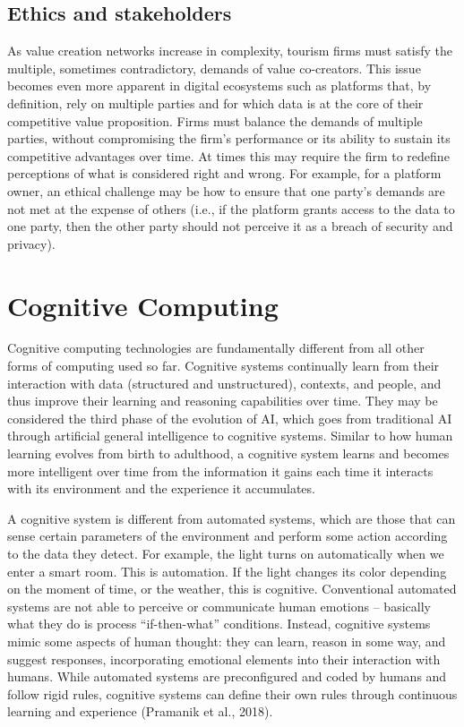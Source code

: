 \documentclass[
  letterpaper,
  DIV=11,
  numbers=noendperiod]{scrreprt}
\begin{document}
\hypertarget{ethics-and-stakeholders}{%
\subsection{Ethics and stakeholders}\label{ethics-and-stakeholders}}

As value creation networks increase in complexity, tourism firms must
satisfy the multiple, sometimes contradictory, demands of value
co-creators. This issue becomes even more apparent in digital ecosystems
such as platforms that, by definition, rely on multiple parties and for
which data is at the core of their competitive value proposition. Firms
must balance the demands of multiple parties, without compromising the
firm's performance or its ability to sustain its competitive advantages
over time. At times this may require the firm to redefine perceptions of
what is considered right and wrong. For example, for a platform owner,
an ethical challenge may be how to ensure that one party's demands are
not met at the expense of others (i.e., if the platform grants access to
the data to one party, then the other party should not perceive it as a
breach of security and privacy).

\hypertarget{cognitive-computing}{%
\section{Cognitive Computing}\label{cognitive-computing}}

Cognitive computing technologies are fundamentally different from all
other forms of computing used so far. Cognitive systems continually
learn from their interaction with data (structured and unstructured),
contexts, and people, and thus improve their learning and reasoning
capabilities over time. They may be considered the third phase of the
evolution of AI, which goes from traditional AI through artificial
general intelligence to cognitive systems. Similar to how human learning
evolves from birth to adulthood, a cognitive system learns and becomes
more intelligent over time from the information it gains each time it
interacts with its environment and the experience it accumulates.

A cognitive system is different from automated systems, which are those
that can sense certain parameters of the environment and perform some
action according to the data they detect. For example, the light turns
on automatically when we enter a smart room. This is automation. If the
light changes its color depending on the moment of time, or the weather,
this is cognitive. Conventional automated systems are not able to
perceive or communicate human emotions -- basically what they do is
process ``if-then-what'' conditions. Instead, cognitive systems mimic
some aspects of human thought: they can learn, reason in some way, and
suggest responses, incorporating emotional elements into their
interaction with humans. While automated systems are preconfigured and
coded by humans and follow rigid rules, cognitive systems can define
their own rules through continuous learning and experience (Pramanik et
al., 2018).
\end{document}
